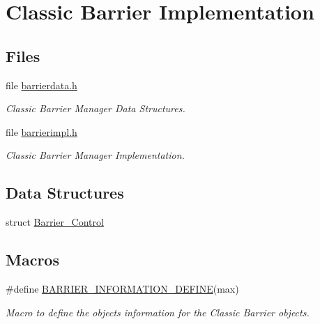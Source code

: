 \hypertarget{group__ClassicBarrierImpl}{}\section{Classic Barrier Implementation}
\label{group__ClassicBarrierImpl}
\subsection*{Files}
\begin{DoxyCompactItemize}
\item 
file \mbox{\hyperlink{barrierdata_8h}{barrierdata.\+h}}
\begin{DoxyCompactList}\small\item\em Classic Barrier Manager Data Structures. \end{DoxyCompactList}\item 
file \mbox{\hyperlink{rtems_2barrierimpl_8h}{barrierimpl.\+h}}
\begin{DoxyCompactList}\small\item\em Classic Barrier Manager Implementation. \end{DoxyCompactList}\end{DoxyCompactItemize}
\subsection*{Data Structures}
\begin{DoxyCompactItemize}
\item 
struct \mbox{\hyperlink{structBarrier__Control}{Barrier\+\_\+\+Control}}
\end{DoxyCompactItemize}
\subsection*{Macros}
\begin{DoxyCompactItemize}
\item 
\#define \mbox{\hyperlink{group__ClassicBarrierImpl_ga10111bd7b5f75f8178f0cc6d1586ec40}{B\+A\+R\+R\+I\+E\+R\+\_\+\+I\+N\+F\+O\+R\+M\+A\+T\+I\+O\+N\+\_\+\+D\+E\+F\+I\+NE}}(max)
\begin{DoxyCompactList}\small\item\em Macro to define the objects information for the Classic Barrier objects. \end{DoxyCompactList}\end{DoxyCompactItemize}
